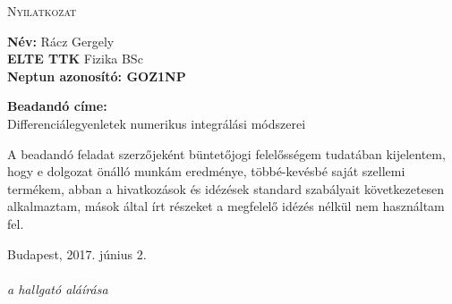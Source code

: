 \newpage
\thispagestyle{empty}
\begin{center}
\Large{ \textsc{Nyilatkozat} }
\end{center}

\vspace*{1cm}
\noindent \textbf{Név:} Rácz Gergely\\
\textbf{ELTE TTK} Fizika BSc \\
\textbf{Neptun azonosító: GOZ1NP} 

\vspace*{0.5cm}
\noindent \textbf{Beadandó címe:} \\
Differenciálegyenletek numerikus integrálási módszerei

\vspace*{2.5cm}
A beadandó feladat szerzőjeként büntetőjogi felelősségem tudatában kijelentem, hogy e dolgozat önálló munkám eredménye, többé-kevésbé saját szellemi termékem, abban a hivatkozások és idézések standard szabályait következetesen alkalmaztam, mások által írt részeket a megfelelő idézés nélkül nem használtam fel.

\vspace*{4.5cm}
\noindent Budapest, 2017. június 2. \\
\hspace*{10.0cm}{.............................................}\\[2ex]
\hspace*{11cm}\emph{a hallgató aláírása}
